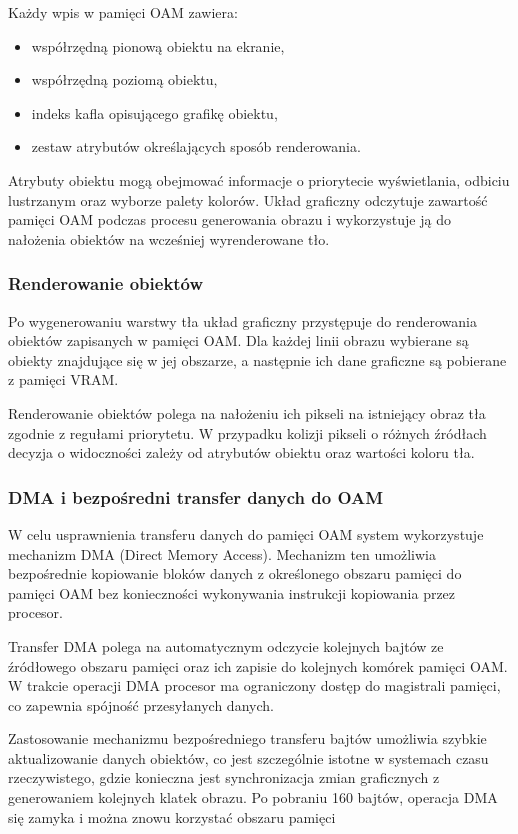 \documentclass{article}
\begin{document}
Każdy wpis w pamięci OAM zawiera:
\begin{itemize}
	\item współrzędną pionową obiektu na ekranie,
	\item współrzędną poziomą obiektu,
	\item indeks kafla opisującego grafikę obiektu,
	\item zestaw atrybutów określających sposób renderowania.
\end{itemize}

Atrybuty obiektu mogą obejmować informacje o priorytecie wyświetlania, odbiciu lustrzanym oraz wyborze palety kolorów. Układ graficzny odczytuje zawartość pamięci OAM podczas procesu generowania obrazu i wykorzystuje ją do nałożenia obiektów na wcześniej wyrenderowane tło.

\subsubsection{Renderowanie obiektów}

Po wygenerowaniu warstwy tła układ graficzny przystępuje do renderowania obiektów zapisanych w pamięci OAM. Dla każdej linii obrazu wybierane są obiekty znajdujące się w jej obszarze, a następnie ich dane graficzne są pobierane z pamięci VRAM.

Renderowanie obiektów polega na nałożeniu ich pikseli na istniejący obraz tła zgodnie z regułami priorytetu. W przypadku kolizji pikseli o różnych źródłach decyzja o widoczności zależy od atrybutów obiektu oraz wartości koloru tła.

\subsubsection{DMA i bezpośredni transfer danych do OAM}

W celu usprawnienia transferu danych do pamięci OAM system wykorzystuje mechanizm DMA (Direct Memory Access). Mechanizm ten umożliwia bezpośrednie kopiowanie bloków danych z określonego obszaru pamięci do pamięci OAM bez konieczności wykonywania instrukcji kopiowania przez procesor.

Transfer DMA polega na automatycznym odczycie kolejnych bajtów ze źródłowego obszaru pamięci oraz ich zapisie do kolejnych komórek pamięci OAM. W trakcie operacji DMA procesor ma ograniczony dostęp do magistrali pamięci, co zapewnia spójność przesyłanych danych.

Zastosowanie mechanizmu bezpośredniego transferu bajtów umożliwia szybkie aktualizowanie danych obiektów, co jest szczególnie istotne w systemach czasu rzeczywistego, gdzie konieczna jest synchronizacja zmian graficznych z generowaniem kolejnych klatek obrazu. Po pobraniu 160 bajtów, operacja DMA się zamyka i można znowu korzystać obszaru pamięci
\end{document}
